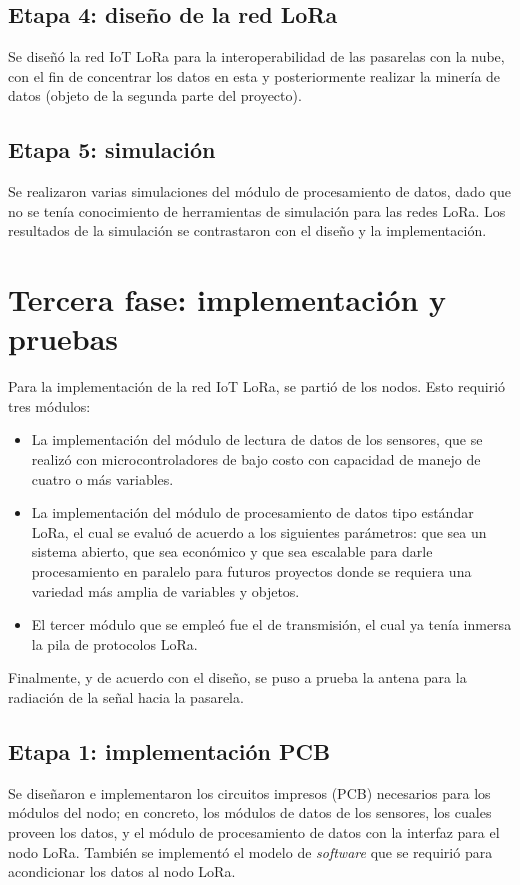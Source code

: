 \subsection{Etapa 4: diseño de la  red LoRa}

Se diseñó la red IoT LoRa para la interoperabilidad de las pasarelas con la nube, con el fin de concentrar los datos en esta y posteriormente realizar la minería de datos (objeto de la segunda parte del proyecto).

\subsection{Etapa 5: simulación}

Se realizaron varias simulaciones del módulo de procesamiento de datos, dado que no se tenía conocimiento de herramientas de simulación para las redes LoRa. Los resultados de la simulación se contrastaron con el diseño y la implementación. 

\section{Tercera fase: implementación y pruebas}
Para la implementación de la red IoT LoRa, se partió de los nodos. Esto requirió tres módulos: 

\begin{itemize}
\item La implementación del módulo de lectura de datos de los sensores, que se realizó con microcontroladores de bajo costo con capacidad de manejo de cuatro o más variables.

\item La implementación del módulo de procesamiento de datos tipo estándar LoRa, el cual se evaluó de acuerdo a los siguientes parámetros: que sea un sistema abierto, que sea económico y que sea escalable para darle procesamiento en paralelo para futuros proyectos donde se requiera una variedad más amplia de variables y objetos.

\item El tercer módulo que se empleó fue el de transmisión, el cual ya tenía inmersa la pila de protocolos LoRa. 
\end{itemize}

Finalmente, y de acuerdo con el diseño, se puso a prueba la antena para la radiación de la señal hacia la pasarela.

\subsection{Etapa 1: implementación PCB}
Se diseñaron e implementaron los circuitos impresos (PCB) necesarios para los módulos del nodo; en concreto, los módulos de datos de los sensores, los cuales proveen los datos, y el módulo de procesamiento de datos con la interfaz para el nodo LoRa. También se implementó el modelo de \emph{software} que se requirió para acondicionar los datos al nodo LoRa.

